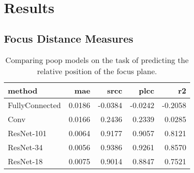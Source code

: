 \chapter{Results}
\label{ch:Results}


\section{Focus Distance Measures}
\label{sec:Results:FocusDistance}



\begin{table}
    \centering
    \caption{Comparing \acs{poop} models on the task of predicting the relative position of the focus plane.}
    \begin{tabular}{|l|rrrr|}
        \hline
        method          & \acs{mae} & \acs{srcc} & \acs{plcc} & \acs{r2} \\
        \hline
        FullyConnected  & 0.0186 & -0.0384 & -0.0242 & -0.2058 \\
        Conv            & 0.0166 &  0.2436 &  0.2339 &  0.0285 \\
        ResNet-101      & 0.0064 &  0.9177 &  0.9057 &  0.8121 \\
        ResNet-34       & 0.0056 &  0.9386 &  0.9261 &  0.8570 \\
        ResNet-18       & 0.0075 &  0.9014 &  0.8847 &  0.7521 \\
        \hline
    \end{tabular}
    \label{tab:Results:Models:Accuracy}
\end{table}

